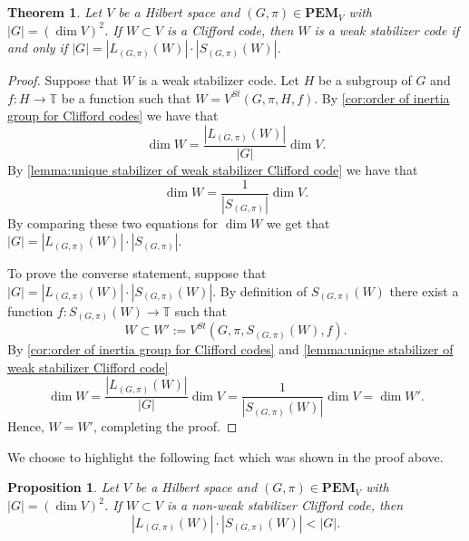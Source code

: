 \documentclass[11pt, oneside, reqno]{amsart}
\newcommand{\bbT}{\mathbb{T}}
\newcommand{\PEM}{\mathbf{PEM}}
\theoremstyle{definition}
\theoremstyle{plain}
\newtheorem{theorem}[definition]{Theorem}
\newtheorem{proposition}[definition]{Proposition}
\theoremstyle{remark}
\begin{document}
\begin{theorem}\label{thm:weak stabilizer Clifford code}
    Let $V$ be a Hilbert space and $(G,\pi) \in \PEM_V$ with $|G| = (\dim V)^2$. If $W \subset V$ is a Clifford code, then $W$ is a weak stabilizer code if and only if $|G| = |L_{(G,\pi)}(W)|\cdot|S_{(G,\pi)}(W)|$.
\end{theorem}
\begin{proof}
    Suppose that $W$ is a weak stabilizer code. Let $H$ be a subgroup of $G$ and $f \colon H \to \bbT$ be a function such that $W = V^{St}(G,\pi,H,f)$. By \cref{cor:order of inertia group for Clifford codes} we have that
    \begin{equation*}
        \dim W = \frac{|L_{(G,\pi)}(W)|}{|G|} \dim V.
    \end{equation*}
    By \cref{lemma:unique stabilizer of weak stabilizer Clifford code} we have that
    \begin{equation*}
        \dim W = \frac{1}{|S_{(G,\pi)}|} \dim V.
    \end{equation*}
    By comparing these two equations for $\dim W$ we get that $|G| = |L_{(G,\pi)}(W)|\cdot|S_{(G,\pi)}|$.

    To prove the converse statement, suppose that $|G| = |L_{(G,\pi)}(W)|\cdot|S_{(G,\pi)}(W)|$. By definition of $S_{(G,\pi)}(W)$ there exist a function $f \colon S_{(G,\pi)}(W) \to \bbT$ such that
    \begin{equation*}
        W \subset W' := V^{St}(G,\pi,S_{(G,\pi)}(W),f).
    \end{equation*}
    By \cref{cor:order of inertia group for Clifford codes} and \cref{lemma:unique stabilizer of weak stabilizer Clifford code}
    \begin{equation*}
        \dim W
        = \frac{|L_{(G,\pi)}(W)|}{|G|} \dim V
        = \frac{1}{|S_{(G,\pi)}(W)|} \dim V
        = \dim W'.
    \end{equation*}
    Hence, $W = W'$, completing the proof.
\end{proof}

We choose to highlight the following fact which was shown in the proof above.

\begin{proposition}\label{prop:failure of being a weak stabilizer code}
    Let $V$ be a Hilbert space and $(G,\pi) \in \PEM_V$ with $|G| = (\dim V)^2$. If $W \subset V$ is a non-weak stabilizer Clifford code, then
    \begin{equation*}
        |L_{(G,\pi)}(W)| \cdot |S_{(G,\pi)}(W)| < |G|.
    \end{equation*}
\end{proposition}
\end{document}
